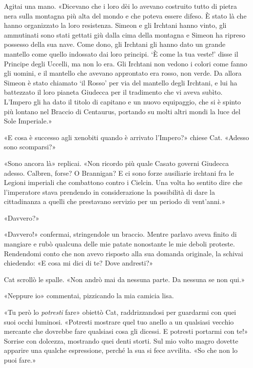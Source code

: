 Agitai una mano. «Dicevano che i loro dèi lo avevano costruito tutto di
pietra nera sulla montagna più alta del mondo e che poteva essere
difeso. È stato là che hanno organizzato la loro resistenza. Simeon e
gli Irchtani hanno vinto, gli ammutinati sono stati gettati giù dalla
cima della montagna e Simeon ha ripreso possesso della sua nave. Come
dono, gli Irchtani gli hanno dato un grande mantello come quello
indossato dai loro principi. `È come la tua veste!' disse il Principe
degli Uccelli, ma non lo era. Gli Irchtani non vedono i colori come
fanno gli uomini, e il mantello che avevano approntato era rosso, non
verde. Da allora Simeon è stato chiamato `il Rosso' per via del mantello
degli Irchtani, e lui ha battezzato il loro pianeta Giudecca per il
tradimento che vi aveva subìto. L'Impero gli ha dato il titolo di
capitano e un nuovo equipaggio, che si è spinto più lontano nel Braccio
di Centaurus, portando su molti altri mondi la luce del Sole Imperiale.»

«E cosa è successo agli xenobiti quando è arrivato l'Impero?» chiese
Cat. «Adesso sono scomparsi?»

«Sono ancora là» replicai. «Non ricordo più quale Casato governi
Giudecca adesso. Calbren, forse? O Brannigan? E ci sono forze ausiliarie
irchtani fra le Legioni imperiali che combattono contro i Cielcin. Una
volta ho sentito dire che l'imperatore stava prendendo in considerazione
la possibilità di dare la cittadinanza a quelli che prestavano servizio
per un periodo di vent'anni.»

«Davvero?»

«Davvero!» confermai, stringendole un braccio. Mentre parlavo aveva
finito di mangiare e rubò qualcuna delle mie patate nonostante le mie
deboli proteste. Rendendomi conto che non avevo risposto alla sua
domanda originale, la schivai chiedendo: «E cosa mi dici di te? Dove
andresti?»

Cat scrollò le spalle. «Non andrò mai da nessuna parte. Da nessuna se
non qui.»

«Neppure io» commentai, pizzicando la mia camicia lisa.

«Tu però lo \emph{potresti} fare» obiettò Cat, raddrizzandosi per
guardarmi con quei suoi occhi luminosi. «Potresti mostrare quel tuo
anello a un qualsiasi vecchio mercante che dovrebbe fare qualsiasi cosa
gli dicessi. E potresti portarmi con te!» Sorrise con dolcezza,
mostrando quei denti storti. Sul mio volto magro dovette apparire una
qualche espressione, perché la sua si fece avvilita. «So che non lo puoi
fare.»

